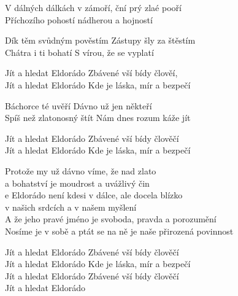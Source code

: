 
\ve{}

V dálných dálkách v zámoří, 
ční prý zlaé pooří \\
Příchozího pohostí
nádherou a hojností

\ve{}

Dík těm svůdným pověstím
Zástupy šly za štěstím\\
Chátra i ti bohatí
S vírou, že se vyplatí

\cho{}

Jít a hledat Eldorádo
Zbávené vší bídy člověí, \\
Jít a hledat Eldorádo
Kde je láska, mír a bezpečí

\ve{}

Báchorce té uvěří
Dávno už jen někteří\\
Spíš než zlatonosný štít
Nám dnes rozum káže jít

\cho{}

Jít a hledat Eldorádo
Zbávené vší bídy člověčí\\
Jít a hledat Eldorádo
Kde je láska, mír a bezpečí

\ve{}
Protože my už dávno víme, že nad zlato\\ a bohatství je moudrost a uvážlivý čin\\
e Eldorádo není kdesi v dálce, ale docela blízko\\ v našich srdcích a v našem myšlení\\
A že jeho pravé jméno je svoboda, pravda a porozumění\\
Nosíme je v sobě a ptát se na ně je naše přirozená povinnost

\cho{}

Jít a hledat Eldorádo
Zbávené vší bídy člověčí\\
Jít a hledat Eldorádo
Kde je láska, mír a bezpečí\\
Jít a hledat Eldorádo
Zbávené vší bídy člověčí\\
Jít a hledat Eldorádo


\esong{}
